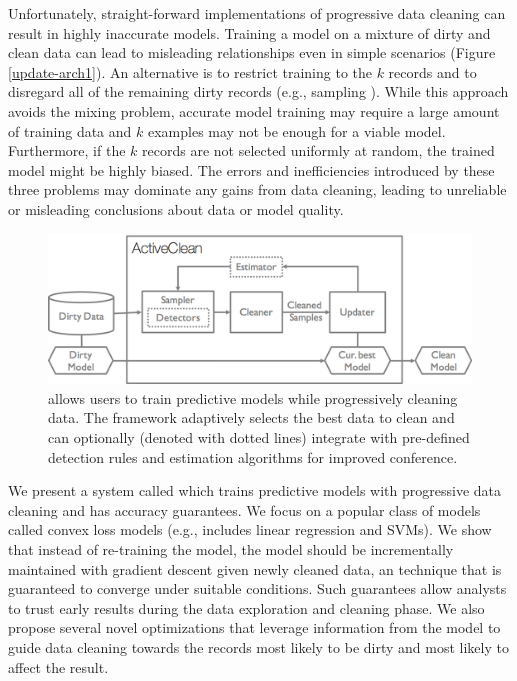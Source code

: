 Unfortunately, straight-forward implementations of progressive data cleaning can result in highly inaccurate models.
Training a model on a mixture of dirty and clean data can lead to misleading relationships even in simple scenarios (Figure \ref{update-arch1}).
An alternative is to restrict training to the $k$ records and to disregard all of the remaining dirty records (e.g., sampling \cite{wang1999sample}).
While this approach avoids the mixing problem, accurate model training may require a large amount of training data and $k$ examples may not be enough for a viable model.
Furthermore, if the $k$ records are not selected uniformly at random, the trained model might be highly biased.
The errors and inefficiencies introduced by these three problems may dominate any gains from data cleaning, leading to unreliable or misleading conclusions about data or model quality.

\begin{figure}[t]
\centering
 \includegraphics[width=\columnwidth]{figs/arch.png}
 \caption{\sysfull allows users to train predictive models while progressively cleaning data. The framework adaptively selects the best data to clean and can optionally (denoted with dotted lines) integrate with pre-defined detection rules and estimation algorithms for improved conference. \label{sys-arch}}\vspace{-2em}
\end{figure}

We present a system called \sys which trains predictive models with progressive data cleaning and has accuracy guarantees.
We focus on a popular class of models called convex loss models (e.g., includes linear regression and SVMs).
We show that instead of re-training the model, the model should be incrementally maintained with gradient descent given newly cleaned data, an technique that is guaranteed to converge under suitable conditions.
Such guarantees allow analysts to trust early results during the data exploration and cleaning phase.
We also propose several novel optimizations that leverage information from the model to guide data cleaning towards the records most likely to be dirty and most likely to affect the result.

